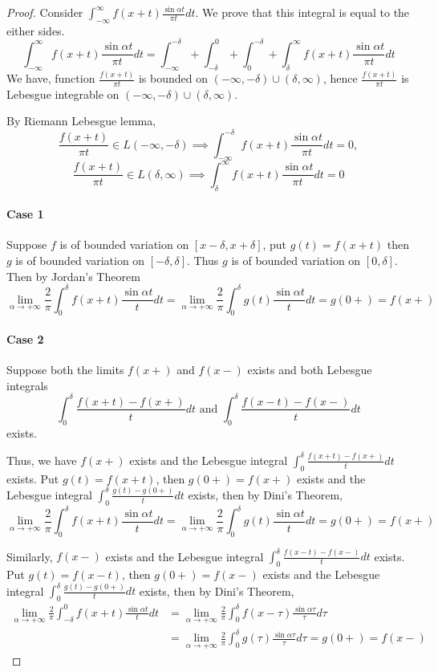 \begin{proof}
	Consider \( \int_{-\infty}^\infty f(x+t) \frac{\sin \alpha t}{\pi t} dt \).
	We prove that this integral is equal to the either sides.
	\[ \int_{-\infty}^\infty f(x+t) \frac{\sin \alpha t}{\pi t} dt = \int_{-\infty}^{-\delta} + \int_{-\delta}^0 + \int_0^{-\delta}  + \int_{\delta}^\infty f(x+t) \frac{\sin \alpha t}{\pi t} dt \] 
	We have, function \( \frac{f(x+t)}{\pi t} \) is bounded on \( (-\infty,-\delta)\cup(\delta,\infty) \), hence \( \frac{f(x+t)}{\pi t} \) is Lebesgue integrable on \( (-\infty,-\delta) \cup (\delta,\infty) \).
	
	By Riemann Lebesgue lemma, 
	\[ \frac{f(x+t)}{\pi t} \in L(-\infty,-\delta) \implies \int_{-\infty}^{-\delta} f(x+t) \frac{\sin \alpha t}{\pi t} dt = 0, \]
	\[ \frac{f(x+t)}{\pi t} \in L(\delta,\infty) \implies \int_{\delta}^{\infty} f(x+t) \frac{\sin \alpha t}{\pi t} dt = 0 \]

	\paragraph{Case 1}
	Suppose $f$ is of bounded variation on $[x-\delta,x+\delta]$, put \( g(t) = f(x+t) \) then $g$ is of bounded variation on $[-\delta,\delta]$.
	Thus $g$ is of bounded variation on $[0,\delta]$.
	Then by Jordan's Theorem
	\[ \lim_{\alpha \to +\infty} \frac{2}{\pi}\int_0^\delta f(x+t)\frac{\sin \alpha t}{t} dt = \lim_{\alpha \to +\infty} \frac{2}{\pi} \int_0^\delta g(t) \frac{\sin \alpha t}{t} dt = g(0+) = f(x+) \]

	\paragraph{Case 2}
	Suppose both the limits $f(x+)$ and $f(x-)$ exists and both Lebesgue integrals
	\[ \int_0^\delta \frac{f(x+t)-f(x+)}{t} dt \text{ and } \int_0^\delta \frac{f(x-t)-f(x-)}{t} dt \]
	exists.

	Thus, we have $f(x+)$ exists and the Lebesgue integral \( \int_0^\delta \frac{f(x+t)-f(x+)}{t} dt \) exists.
	Put \( g(t) = f(x+t) \), then \( g(0+) = f(x+) \) exists and the Lebesgue integral \( \int_0^\delta \frac{g(t)-g(0+)}{t} dt \) exists, then by Dini's Theorem,
	\[ \lim_{\alpha \to +\infty} \frac{2}{\pi}\int_0^\delta f(x+t)\frac{\sin \alpha t}{t} dt = \lim_{\alpha \to +\infty} \frac{2}{\pi} \int_0^\delta g(t) \frac{\sin \alpha t}{t} dt = g(0+) = f(x+) \]

	Similarly, $f(x-)$ exists and the Lebesgue integral \( \int_0^\delta \frac{f(x-t)-f(x-)}{t} dt \) exists.
	Put \( g(t) = f(x-t) \), then \( g(0+) = f(x-) \) exists and the Lebesgue integral \( \int_0^\delta \frac{g(t)-g(0+)}{t} dt \) exists, then by Dini's Theorem,
	\begin{align*}
		\lim_{\alpha \to +\infty} \frac{2}{\pi}\int_{-\delta}^0 f(x+t)\frac{\sin \alpha t}{t} dt 
		& = \lim_{\alpha \to +\infty} \frac{2}{\pi} \int_0^\delta f(x-\tau) \frac{\sin \alpha \tau}{\tau} d\tau\\
		& = \lim_{\alpha \to +\infty} \frac{2}{\pi} \int_0^\delta g(\tau) \frac{\sin \alpha \tau}{\tau} d\tau = g(0+) = f(x-)
	\end{align*}


\end{proof}
